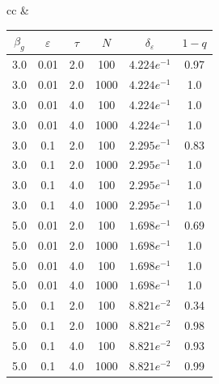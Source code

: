 {\begin{center}
\begin{tabular}{cc}
      &

      \begin{tabular}{|c|c|c|c|c|c|}
        \hline
        $\beta_g$ & $\varepsilon$  & $\tau$  & $N$ & $\delta_{\varepsilon}$ & $1-q$   \\
        \hline
        3.0   & 0.01   & 2.0  &  100  &  $4.224e^{-1}$   & 0.97\\
        \hline
        3.0  &  0.01   & 2.0   &   1000   & $4.224e^{-1}$   & 1.0\\
        \hline
        3.0  &  0.01 &   4.0  &    100  &  $4.224e^{-1}$  &  1.0\\
        \hline
        3.0  &  0.01  &  4.0  &    1000  &  $4.224e^{-1}$  &  1.0\\
        \hline
        3.0  &  0.1 &   2.0  &    100 &   $2.295e^{-1}$ &   0.83\\
        \hline
        3.0   & 0.1  &  2.0  &      1000  &  $2.295e^{-1}$  &  1.0\\
        \hline
        3.0  &  0.1  &  4.0 &       100  &  $2.295e^{-1}$ &   1.0\\
        \hline
        3.0   & 0.1   & 4.0  &   1000  & $2.295e^{-1}$  &  1.0\\
        \hline
        5.0  & 0.01 &  2.0  &  100  & $1.698e^{-1}$ &  0.69\\
        \hline
        5.0  & 0.01  & 2.0 &   1000  & $1.698e^{-1}$  & 1.0\\
        \hline
        5.0 &  0.01 &  4.0  & 100  & $1.698e^{-1}$  & 1.0\\
        \hline
        5.0  & 0.01 &  4.0  &   1000  & $1.698e^{-1}$  & 1.0\\
        \hline
        5.0  & 0.1&  2.0  &  100  & $8.821 e^{-2}$&  0.34\\
        \hline
        5.0   &0.1 &  2.0&    1000&   $8.821 e^{-2}$ &  0.98\\
        \hline
        5.0   &0.1  & 4.0  &  100  & $8.821 e^{-2}$  & 0.93\\
        \hline
        5.0   &0.1  & 4.0 &   1000 & $8.821 e^{-2}$  & 0.99\\
        \hline
      \end{tabular}

    \end{tabular}
  \end{center}


}
